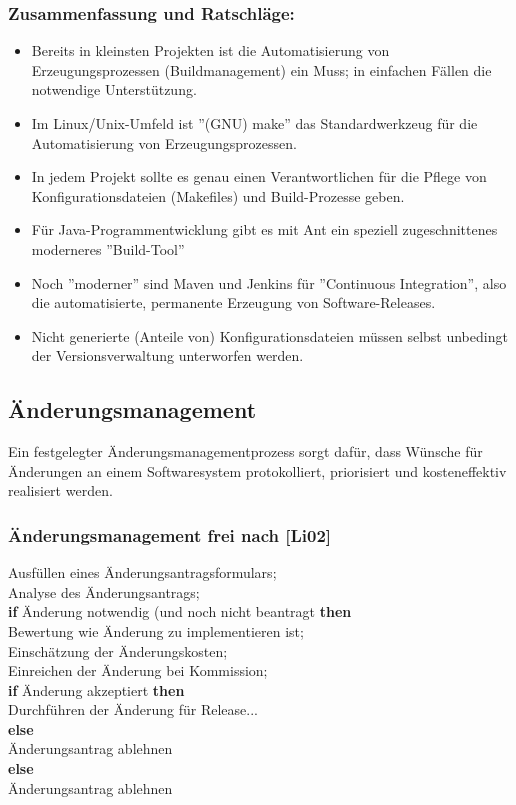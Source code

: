\subsubsection{Zusammenfassung und Ratschläge:}
\begin{itemize}
	\item Bereits in kleinsten Projekten ist die Automatisierung von Erzeugungsprozessen (Buildmanagement) ein Muss; in einfachen Fällen die notwendige Unterstützung.
	\item Im Linux/Unix-Umfeld ist ''(GNU) make'' das Standardwerkzeug für die Automatisierung von Erzeugungsprozessen.
	\item In jedem Projekt sollte es genau einen Verantwortlichen für die Pflege von Konfigurationsdateien (Makefiles) und Build-Prozesse geben.
	\item Für Java-Programmentwicklung gibt es mit Ant ein speziell zugeschnittenes moderneres ''Build-Tool''
	\item Noch ''moderner'' sind Maven und Jenkins für ''Continuous Integration'', also die automatisierte, permanente Erzeugung von Software-Releases.
	\item Nicht generierte (Anteile von) Konfigurationsdateien müssen selbst unbedingt der Versionsverwaltung unterworfen werden.
\end{itemize}
\subsection{Änderungsmanagement}
Ein festgelegter Änderungsmanagementprozess sorgt dafür, dass Wünsche für Änderungen an einem Softwaresystem protokolliert, priorisiert und kosteneffektiv realisiert werden.

\subsubsection{Änderungsmanagement frei nach [Li02]}
Ausfüllen eines Änderungsantragsformulars; \\
Analyse des Änderungsantrags; \\
\textbf{if} Änderung notwendig (und noch nicht beantragt \textbf{then} \\
Bewertung wie Änderung zu implementieren ist; \\
Einschätzung der Änderungskosten; \\
Einreichen der Änderung bei Kommission; \\
\textbf{if} Änderung akzeptiert \textbf{then} \\
Durchführen der Änderung für Release... \\
\textbf{else} \\
Änderungsantrag ablehnen \\
\textbf{else} \\
Änderungsantrag ablehnen

